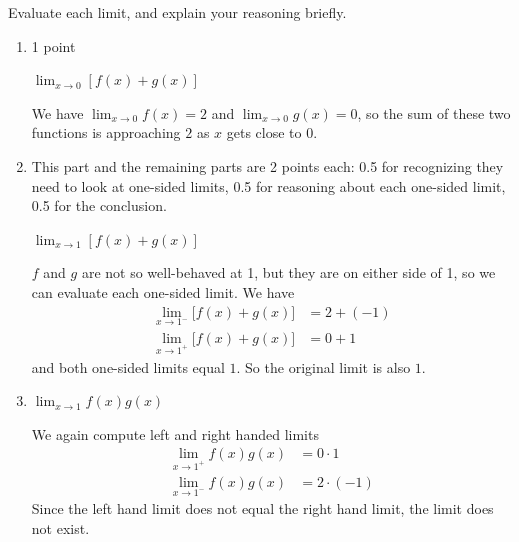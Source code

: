 \documentclass{article}
\begin{document}
\begin{enumerate}
  Evaluate each limit, and explain your reasoning briefly.

  \begin{enumerate}
  \item

    \begin{grading}
      1 point
    \end{grading}

    \begin{problem}[\vfill]
      $\displaystyle \lim_{x \to 0} [f(x) + g(x)]$
    \end{problem}

    \begin{solution}
      We have $\displaystyle\lim_{x \to 0} f(x) = 2$ and $\displaystyle\lim_{x \to 0} g(x) = 0$, so the sum of these two functions is approaching $\boxed{2}$ as $x$ gets close to $0$. 
    \end{solution}

  \item

    \begin{grading}
      This part and the remaining parts are 2 points each: 0.5 for recognizing they need to look at one-sided limits, 0.5 for reasoning about each one-sided limit, 0.5 for the conclusion.
    \end{grading}

    \begin{problem}[\vfill]
      $\displaystyle \lim_{x \to 1} [f(x) + g(x)]$
    \end{problem}

    \begin{solution}
      $f$ and $g$ are not so well-behaved at 1, but they are on either side of 1, so we can evaluate each one-sided limit. We have 
      \begin{align*}
        \lim_{x \to 1^-} \big[ f(x) + g(x) \big] &= 2 + (-1) \\
        \lim_{x \to 1^+} \big[ f(x) + g(x) \big] &= 0 + 1
      \end{align*} 
      and both one-sided limits equal $1$. So the original limit is also $\boxed{1}$.
    \end{solution}

  \item
    \begin{problem}[\vfill]
      $\displaystyle \lim_{x \to 1} f(x) g(x)$
    \end{problem}

    \begin{solution}
      We again compute left and right handed limits 
      \begin{align*} 
        \lim_{x \rightarrow 1^+} f(x) g(x) &= 0 \cdot 1\\
        \lim_{x \rightarrow 1^-} f(x) g(x) &= 2 \cdot (-1) 
      \end{align*} 
      Since the left hand limit does not equal the right hand limit, the limit does not exist. 
    \end{solution}


\end{enumerate}
\end{enumerate}
\end{document}
